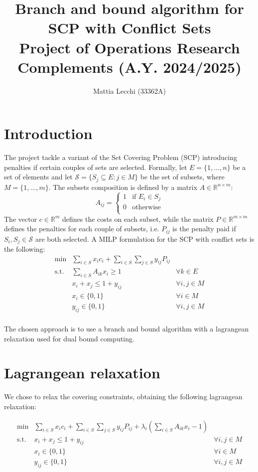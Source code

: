 \documentclass[a4paper]{article}
\author{Mattia Lecchi (33362A)}
\title{Branch and bound algorithm for SCP with Conflict Sets\\ 
	\large Project of Operations Research Complements (A.Y. 2024/2025)}
\begin{document}
	\maketitle
	
\section{Introduction}
The project tackle a variant of the Set Covering Problem (SCP) introducing penalties if certain couples of sets are selected. Formally, let $E=\{1,...,n\}$ be a set of elements and let $\mathcal S=\{S_j\subseteq E : j \in M\}$ be the set of subsets, where $M=\{1,...,m\}$. 
The subsets composition is defined by a matrix $A \in \mathbb R^{n\times m}$:
$$
A_{ij} =
\begin{cases}
	1& \text{if } E_i \in S_j\\
	0& \text{otherwise}\\
\end{cases}
$$
The vector $c \in \mathbb R^{m}$ defines the costs on each subset, while the matrix $P \in \mathbb R^{m\times m}$ defines the penalties for each couple of subsets, i.e. $P_{ij}$ is the penalty paid if $S_i,S_j\in \mathcal S$ are both selected.
A MILP formulation for the SCP with conflict sets is the following:
\begin{align}
	\min & \sum_{i\in S} x_i c_i + \sum_{i \in S} \sum_{j \in S} y_{ij} P_{ij} & \\
	\text{s.t. } 
	& \sum_{i\in S} A_{ik} x_i \ge 1 & \forall k \in E \\
	& x_i + x_j \le 1 + y_{ij} & \forall i,j \in M \\
	& x_i \in \{0, 1\} & \forall i \in M \\
	& y_{ij} \in \{0, 1\} & \forall i,j \in M\\
\end{align}

The chosen approach is to use a branch and bound algorithm with a lagrangean relaxation used for dual bound computing.

\section{Lagrangean relaxation}

We chose to relax the covering constraints, obtaining the following lagrangean relaxation:

\begin{align}
	\min & \sum_{i\in S} x_i c_i + \sum_{i \in S} \sum_{j \in S} y_{ij} P_{ij} + \lambda_i \left(\sum_{i\in S}A_{ik} x_i - 1\right)  & \\
	\text{s.t. }
	& x_i + x_j \le 1 + y_{ij} & \forall i,j \in M \\
	& x_i \in \{0, 1\} & \forall i \in M \\
	& y_{ij} \in \{0, 1\} & \forall i,j \in M\\
\end{align}
	
	
\end{document}
